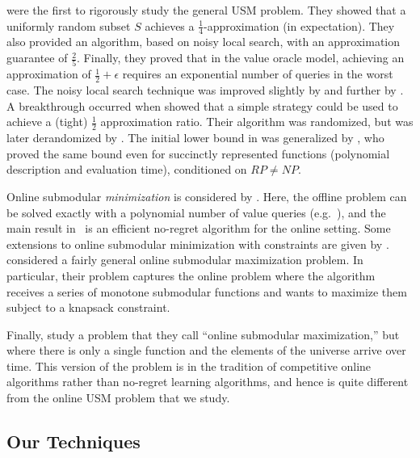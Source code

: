 \documentclass[final,12pt]{colt2018}
\begin{document}
\cite{FMV11} were the first to
rigorously study the general USM problem. They showed that a uniformly
random subset $S$ achieves a $\frac14$-approximation (in
expectation). They also provided an algorithm, based on noisy local
search, with an approximation
guarantee of $\frac25$.
Finally, they proved that in the value oracle model, achieving an
approximation of $\frac12 + \epsilon$ requires an exponential number
of queries in the worst case. The noisy local search technique was
improved slightly by 
\cite{GV11} and further by 
\cite{FNS11}. A breakthrough occurred
when 
\cite{BFNS15} showed that a simple strategy
could be used to achieve a (tight) $\frac12$ approximation
ratio. Their algorithm was randomized, but was later derandomized by
\cite{BF16}.
The initial lower bound in \cite{FMV11}
was generalized by
\cite{DV12}, who proved the same bound even for succinctly
represented functions (polynomial description and evaluation time),
conditioned on $RP \neq NP$.

Online submodular {\em minimization} is considered by 
\cite{HK12}.  Here, the offline problem can be solved exactly
with a polynomial number of value queries (e.g.~\cite{GLS88}), and the
main result in~\cite{HK12} is an efficient no-regret algorithm for the
online setting.  Some extensions to online submodular minimization
with constraints are given by 
\cite{JB11}.
\cite{SG09} considered a fairly general online
submodular maximization problem. In particular, their problem captures
the online problem where the algorithm receives a series of monotone
submodular functions and wants to maximize them subject to a knapsack
constraint.

Finally, 
\cite{BFS15} study a problem that they call
``online submodular maximization,'' but where there is only a single
function and the elements of the universe arrive over time.  This
version of the problem is in the tradition of competitive online
algorithms rather than no-regret learning algorithms, and hence is
quite different from the online USM problem that we study.

\subsection{Our Techniques}
\end{document}
